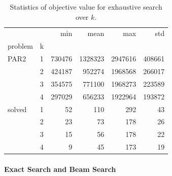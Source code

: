\documentclass[conference]{IEEEtran}
\begin{document}
\begin{table}[htb]
	\centering
	\caption{Statistics of objective value for exhaustive search over $k$.}
	\label{tab:objective-exhaustive}
	\begin{tabular}{llrrrr}
		\toprule
		&   &     min &     mean &      max &     std \\
		problem & k &         &          &          &         \\
		\midrule
		PAR2 & 1 &  730476 &  1328323 &  2947616 &  408661 \\
		& 2 &  424187 &   952274 &  1968568 &  266017 \\
		& 3 &  354575 &   771100 &  1968273 &  223589 \\
		& 4 &  297029 &   656233 &  1922964 &  193872 \\
		solved & 1 &      52 &      110 &      292 &      43 \\
		& 2 &      23 &       73 &      178 &      26 \\
		& 3 &      15 &       56 &      178 &      22 \\
		& 4 &       9 &       45 &      173 &      19 \\
		\bottomrule
	\end{tabular}
\end{table}

\paragraph{Exact Search and Beam Search}
\end{document}
